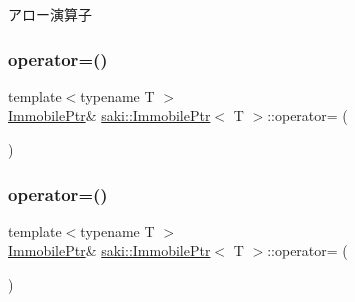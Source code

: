 アロー演算子 

\mbox{\label{classsaki_1_1_immobile_ptr_ad302722791d66a361f6e198696412d4b}} 
\subsubsection{\texorpdfstring{operator=()}{operator=()}\hspace{0.1cm}{\footnotesize\ttfamily [1/2]}}
{\footnotesize\ttfamily template$<$typename T $>$ \\
\mbox{\hyperlink{classsaki_1_1_immobile_ptr}{Immobile\+Ptr}}\& \mbox{\hyperlink{classsaki_1_1_immobile_ptr}{saki\+::\+Immobile\+Ptr}}$<$ T $>$\+::operator= (\begin{DoxyParamCaption}\item[{const \mbox{\hyperlink{classsaki_1_1_immobile_ptr}{Immobile\+Ptr}}$<$ T $>$ \&}]{ }\end{DoxyParamCaption})\hspace{0.3cm}{\ttfamily [delete]}}

\mbox{\label{classsaki_1_1_immobile_ptr_a115f6cb0829142d395840b921b0df629}} 
\subsubsection{\texorpdfstring{operator=()}{operator=()}\hspace{0.1cm}{\footnotesize\ttfamily [2/2]}}
{\footnotesize\ttfamily template$<$typename T $>$ \\
\mbox{\hyperlink{classsaki_1_1_immobile_ptr}{Immobile\+Ptr}}\& \mbox{\hyperlink{classsaki_1_1_immobile_ptr}{saki\+::\+Immobile\+Ptr}}$<$ T $>$\+::operator= (\begin{DoxyParamCaption}\item[{\mbox{\hyperlink{classsaki_1_1_immobile_ptr}{Immobile\+Ptr}}$<$ T $>$ \&\&}]{ }\end{DoxyParamCaption})\hspace{0.3cm}{\ttfamily [delete]}}

\mbox{\label{classsaki_1_1_immobile_ptr_a669b89e9c884f703f9dafc1257d694bf}} 
